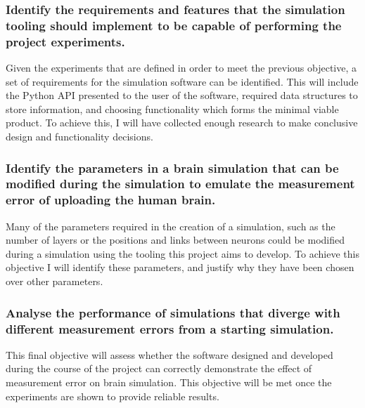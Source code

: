 \subsubsection{Identify the requirements and features that the simulation
      tooling should implement to be capable of performing the project experiments.}

Given the experiments that are defined in order to meet the previous objective,
a set of requirements for the simulation software can be identified. This will
include the Python API presented to the user of the software, required data
structures to store information, and choosing functionality which forms the
minimal viable product. To achieve this, I will have collected enough research
to make conclusive design and functionality decisions.


\subsubsection{Identify
      the parameters in a brain simulation that can be modified during the simulation
      to emulate the measurement error of uploading the human brain.}

Many of the parameters required in the creation of a simulation, such as the
number of layers or the positions and links between neurons could be modified
during a simulation using the tooling this project aims to develop. To achieve
this objective I will identify these parameters, and justify why they have been
chosen over other parameters.


\subsubsection{Analyse the performance of simulations
      that diverge with different measurement errors from a starting simulation.}

This final objective will assess whether the software designed and developed
during the course of the project can correctly demonstrate the effect of
measurement error on brain simulation. This objective will be met once the
experiments are shown to provide reliable results.

\pagebreak



